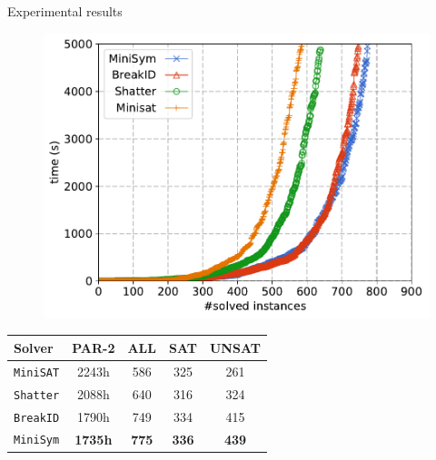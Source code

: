 \documentclass{beamer}
\begin{document}
\begin{frame}{Experimental results}

\begin{figure}[t]
\centering
	{\includegraphics[scale=0.45]{images/bliss-result}}
\label{fig:cactus}%
\end{figure}

\begin{table}
%

\begin{tabular}{lcccc}
	Solver & PAR-2 & ALL & SAT & UNSAT\\
	\toprule
	\texttt{MiniSAT} & 2243h & 586 &325 &261 \\
	\texttt{Shatter} &2088h & 640 & 316 &324 \\
	\texttt{BreakID} &1790h & 749 &334 &415 \\
	\texttt{MiniSym} &  \cellcolor{gray!30}\textbf{1735h} &  \cellcolor{gray!30}\textbf{775} & \cellcolor{gray!30}\textbf{336} &  \cellcolor{gray!30}\textbf{439} \\


\end{tabular}
\end{table}
\end{frame}
\end{document}
